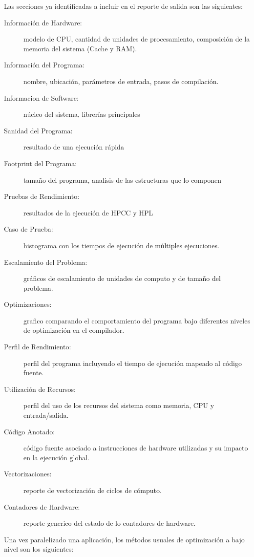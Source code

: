 \documentclass[a4paper]{article}
\begin{document}
Las secciones ya identificadas a incluir en el reporte de salida son las siguientes:

\begin{description}
\item[Información de Hardware:] modelo de CPU, cantidad de unidades de procesamiento, composición de la memoria del sistema (Cache y RAM).
\item[Información del Programa:] nombre, ubicación, parámetros de entrada, pasos de compilación.
\item[Informacion de Software:] núcleo del sistema, librerías principales
\item[Sanidad del Programa:] resultado de una ejecución rápida
\item[Footprint del Programa:] tamaño del programa, analisis de las estructuras que lo componen
\item[Pruebas de Rendimiento:] resultados de la ejecución de HPCC y HPL
\item[Caso de Prueba:] histograma con los tiempos de ejecución de múltiples ejecuciones.
\item[Escalamiento del Problema:] gráficos de escalamiento de unidades de computo y de tamaño del problema.
\item[Optimizaciones:] grafico comparando el comportamiento del programa bajo diferentes niveles de optimización en el compilador.
\item[Perfil de Rendimiento:] perfil del programa incluyendo el tiempo de ejecución mapeado al código fuente.
\item[Utilización de Recursos:] perfil del uso de los recursos del sistema como memoria, CPU y entrada/salida.
\item[Código Anotado:] código fuente asociado a instrucciones de hardware utilizadas y su impacto en la ejecución global.
\item[Vectorizaciones:] reporte de vectorización de ciclos de cómputo.
\item[Contadores de Hardware:] reporte generico del estado de lo contadores de hardware.
\end{description}


\bigskip

Una vez paralelizado una aplicación, los métodos usuales de optimización a bajo nivel son los siguientes:
\end{document}
